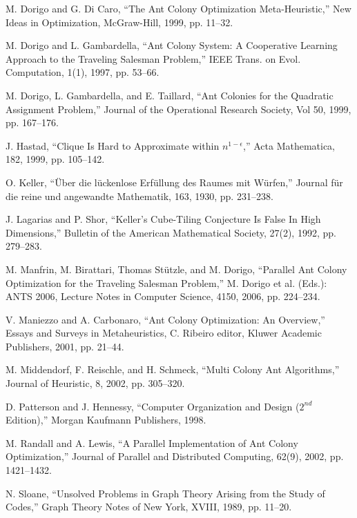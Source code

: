 \documentclass[11pt]{article}
\begin{document}
\begin{thebibliography}{99}
M. Dorigo and G. Di Caro, ``The Ant Colony Optimization Meta-Heuristic,'' New Ideas in Optimization, McGraw-Hill, 1999, pp. 11--32.


M. Dorigo and L. Gambardella, ``Ant Colony System: A Cooperative Learning Approach to the Traveling Salesman Problem,'' IEEE Trans. on Evol. Computation, 1(1), 1997, pp. 53--66.

M. Dorigo, L. Gambardella, and E. Taillard, ``Ant Colonies for the Quadratic Assignment Problem,'' Journal of the Operational Research Society, Vol 50, 1999, pp. 167--176.


J. Hastad, ``Clique Is Hard to Approximate within $n^{1 - \epsilon}$,'' Acta Mathematica, 182, 1999, pp. 105--142.


O. Keller, ``\"Uber die l\"uckenlose Erf\"ullung des Raumes mit W\"urfen,'' Journal f\"ur die reine und angewandte Mathematik, 163,  1930, pp. 231--238.

J. Lagarias and P. Shor, ``Keller's Cube-Tiling Conjecture Is False In High Dimensions,'' Bulletin of the American Mathematical Society, 27(2), 1992, pp. 279--283.


M. Manfrin, M. Birattari, Thomas St\"utzle, and M. Dorigo, ``Parallel Ant Colony Optimization for the Traveling Salesman Problem,'' M. Dorigo et al. (Eds.): ANTS 2006, Lecture Notes in Computer Science, 4150, 2006, pp. 224--234.


V. Maniezzo and A. Carbonaro, ``Ant Colony Optimization: An Overview,'' Essays and Surveys in Metaheuristics, C. Ribeiro editor, Kluwer Academic Publishers, 2001, pp. 21--44.



M. Middendorf, F. Reischle, and H. Schmeck, ``Multi Colony Ant Algorithms,'' Journal of Heuristic, 8, 2002, pp. 305--320.


D. Patterson and J. Hennessy, ``Computer Organization and Design ($2^{nd}$ Edition),'' Morgan Kaufmann Publishers, 1998.


M. Randall and A. Lewis, ``A Parallel Implementation of Ant Colony Optimization,'' Journal of Parallel and Distributed Computing, 62(9), 2002, pp. 1421--1432.

N. Sloane, ``Unsolved Problems in Graph Theory Arising from the Study of Codes,'' Graph Theory Notes of New York, XVIII, 1989, pp. 11--20.



\end{thebibliography}
\end{document}
